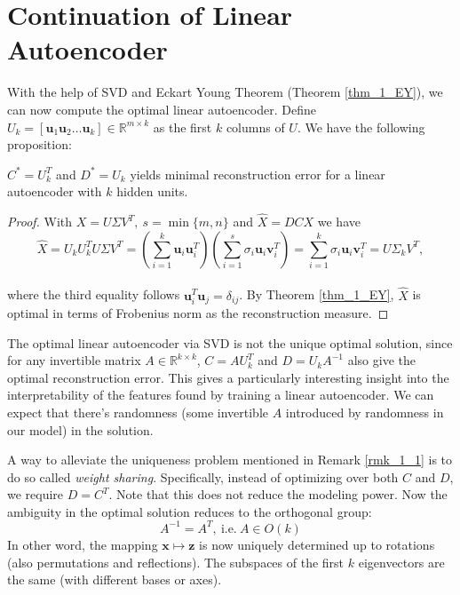 \documentclass[../main.tex]{subfiles}
\begin{document}
\section{Continuation of Linear Autoencoder}
With the help of SVD and Eckart Young Theorem (Theorem \ref{thm_1_EY}), we can now compute the optimal linear autoencoder. Define $U_k=[\bm{u}_1\bm{u}_2\dots \bm{u}_k]\in \mathbb{R}^{m\times k}$ as the first $k$ columns of $U$. We have the following proposition:
\begin{proposition}
	$C^*=U_k^T$ and $D^*=U_k$ yields minimal reconstruction error for a linear autoencoder with $k$ hidden units.
\end{proposition}
\begin{proof}
	With $X=U\Sigma V^T,\ s=\min\{m,n\}$ and $\hat{X}=DCX$ we have
	\begin{equation*}
	\hat{X} = U_k U_k^T U\Sigma V^T = \left(\sum_{i=1}^{k}\bm{u}_i\bm{u}^T_i\right)\left(\sum_{i=1}^{s}\sigma_i\bm{u}_i\bm{v}^T_i\right) = \sum_{i=1}^{k}\sigma_i\bm{u}_i\bm{v}^T_i = U\Sigma_kV^T,
	\end{equation*}\\
	where the third equality follows $\bm{u}_i^T\bm{u}_j=\delta_{ij}$. By Theorem \ref{thm_1_EY}, $\hat{X}$ is optimal in terms of Frobenius norm as the reconstruction measure.
\end{proof}
\begin{remark}\label{rmk_1_1}
	The optimal linear autoencoder via SVD is not the unique optimal solution, since for any invertible matrix $A\in\mathbb{R}^{k\times k}$, $C=AU_k^T$ and $D=U_kA^{-1}$ also give the optimal reconstruction error. This gives a particularly interesting insight into the interpretability of the features found by training a linear autoencoder. We can expect that there's randomness (some invertible $A$ introduced by randomness in our model) in the solution.
\end{remark}
A way to alleviate the uniqueness problem mentioned in Remark \ref{rmk_1_1} is to do so called \emph{weight sharing}. Specifically, instead of optimizing over both $C$ and $D$, we require $D=C^T$. Note that this does not reduce the modeling power. Now the ambiguity in the optimal solution reduces to the orthogonal group: 
\begin{equation*}
A^{-1}=A^T,\ \text{i.e.}\ A\in O(k)
\end{equation*}
In other word, the mapping $\bm{x}\mapsto \bm{z}$ is now uniquely determined up to rotations (also permutations and reflections). The subspaces of the first $k$ eigenvectors are the same (with different bases or axes).
\end{document}

